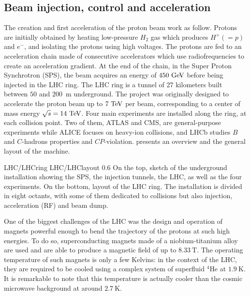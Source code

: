     \subsection{Beam injection, control and acceleration}

    The creation and first acceleration of the proton beam work as follow. Protons are initially
    obtained by heating low-pressure $H_2$ gas which produces $H^+ (= p)$ and $e^-$, and
    isolating the protons using high voltages. The protons are fed to an acceleration
    chain made of consecutive accelerators which use radiofrequencies to create an acceleration
    gradient. At the end of the chain, in the Super Proton Synchrotron (SPS), the
    beam acquires an energy of $450~\text{GeV}$ before being injected in the LHC ring. The LHC
    ring is a tunnel of 27 kilometers built between $50$ and $200$~m underground. The
    project was originally designed to accelerate the proton beam up to $7~\text{TeV}$ per beam,
    corresponding to a center of mass energy $\sqrt{s} = 14~\text{TeV}$. Four main experiments are
    installed along the ring, at each collision point. Two of them, ATLAS and CMS, are
    general-purpose experiments while ALICE focuses on heavy-ion collisions, and LHCb studies
    $B$ and $C$-hadrons properties and $CP$-violation.  presents an
    overview and the general layout of the machine.

                     {LHC/LHCring}
                     {LHC/LHClayout}
                     {0.6}
                     {On the top, sketch of the underground installation showing the SPS,
                     the injection tunnels, the LHC, as well as the four experiments. On
                     the bottom, layout of the LHC ring. The installation is divided in
                     eight octants, with some of them dedicated to collisions but also
                     injection, acceleration (RF) and beam dump.}

    One of the biggest challenges of the LHC was the design and operation of magnets
    powerful enough to bend the trajectory of the protons at such high energies. To do
    so, superconducting magnets made of a niobium-titanium alloy are used and are able to
    produce a magnetic field of up to $8.33~\text{T}$. The operating temperature of such magnets
    is only a few Kelvins: in the context of the LHC, they are required to be cooled using
    a complex system of superfluid $^4$He at $1.9~\text{K}$. It is remarkable to note that this
    temperature is actually cooler than the cosmic microwave background at around $2.7~\text{K}$.

